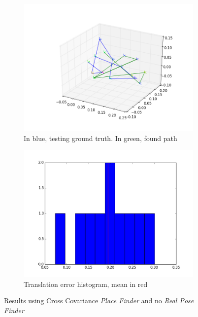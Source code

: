 \begin{figure}[htpb]
  \begin{subfigure}[b]{6cm}
          \includegraphics[width=\linewidth]{img/desktop_2_CC_empty_path_1.png}
          \caption{In blue, testing ground truth. In green, found path}                
          \label{fig:desktop_2_CC_empty_path_1}
  \end{subfigure}   
  \qquad
  \begin{subfigure}[b]{6cm}
         \includegraphics[width=\linewidth]{img/desktop_2_CC_empty_dist_1.png}
         \caption{Translation error histogram, mean in red} 
         \label{fig:desktop_2_CC_empty_dist_1}
  \end{subfigure}
  \caption{Results using Cross Covariance \textit{Place Finder} and no \textit{Real Pose Finder}}
\end{figure}

